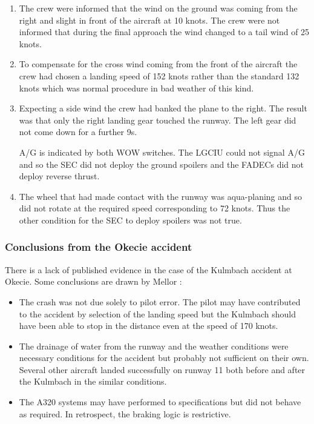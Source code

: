 \begin{enumerate}

\item The crew were informed that the wind on the ground was coming
  from the right and slight in front of the aircraft at 10 knots.  The
  crew were not informed that during the final approach the wind
  changed to a tail wind of 25 knots.

\item To compensate for the cross wind coming from the front of the
  aircraft the crew had chosen a landing speed of 152 knots rather
  than the standard 132 knots which was normal procedure in bad
  weather of this kind.


\item Expecting a side wind the crew had banked the plane to the
  right.  The result was that only the right landing gear touched the
  runway.  The left gear did not come down for a further 9s.

  A/G is indicated by both WOW switches.  The LGCIU could not signal
  A/G and so the SEC did not deploy the ground spoilers and the FADECs
  did not deploy reverse thrust.

\item The wheel that had made contact with the runway was aqua-planing
  and so did not rotate at the required speed corresponding to 72
  knots.  Thus the other condition for the SEC to deploy spoilers was
  not true.

  \end{enumerate}





  \subsubsection*{Conclusions from the Okecie accident}

  There is a lack of published evidence in the case of the Kulmbach
  accident at Okecie.  Some conclusions are drawn by Mellor \cite{mellor1994cad}:

 \begin{itemize}

  \item The crash was not due solely to pilot error.  The pilot may have
  contributed to the accident by selection of the landing speed but the
  Kulmbach should have been able to stop in the distance even at the
  speed of 170 knots. 

  \item The drainage of water from the runway and the weather conditions
  were necessary conditions for the accident but probably not sufficient
  on their own.  Several other aircraft landed successfully on runway 11
  both before and after the Kulmbach in the similar conditions. 

  \item The A320 systems may have performed to specifications but did
  not behave as required.  In retrospect, the braking logic is
  restrictive. 

  \end{itemize}

